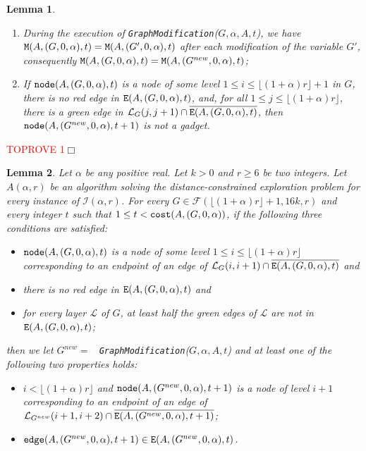 \documentclass[11pt]{article}
\newtheorem{lemma}{Lemma}[section]
\newcommand{\qed}{\hfill $\Box$ \bigbreak}
\newenvironment{proof}{\noindent {\bf Proof.}}{\qed}
\begin{document}
{\begin{lemma}
\begin{enumerate}
\item During the execution of {\tt GraphModification}($G,\alpha,A,t$), we have 
  ${\tt M}(A,(G,0,\alpha),t)={\tt M}(A,(G',0,\alpha),t)$ after each
  modification of the variable $G'$, consequently ${\tt M}(A,(G,0,\alpha),t)={\tt M}(A,(G^{new},0,\alpha),t)$;

\item If ${\tt node}(A,(G,0,\alpha),t)$ is a node of some level
  $1\leq i\leq\lfloor(1+\alpha)r\rfloor+1$ in $G$, there is no red edge in ${\tt E}(A,(G,0,\alpha),t)$, and, for all $1\leq j \leq
  \lfloor(1+\alpha)r\rfloor$, there is a green edge in
  $\mathcal{L}_{G}(j,j+1)\cap\overline{{\tt E}(A,(G,0,\alpha),t)}$,
  then ${\tt node}(A,(G^{new},0,\alpha),t+1)$ is not a gadget.
\end{enumerate}
\end{lemma}

\begin{proof}\textcolor{red}{TOPROVE 1}\end{proof}

\begin{lemma}
\label{lem:adv2}
Let $\alpha$ be any positive real. Let $k>0$ and $r\geq 6$ be two integers.
%
Let $A(\alpha,r)$ be an algorithm solving the distance-constrained exploration problem for every instance of $\mathcal{I}(\alpha,r)$.
%
For every $G\in\mathcal{F}(\lfloor(1+\alpha)r\rfloor+1,16k,r)$ and every integer $t$ such that $1\leq t < {\tt cost}(A,(G,0,\alpha))$, if the following three conditions are satisfied: 
\begin{itemize}
\item ${\tt node}(A,(G,0,\alpha),t)$ is a node of some level $1\leq i\leq\lfloor(1+\alpha)r\rfloor$ corresponding to an endpoint of an edge of $\mathcal{L}_{G}(i,i+1)\cap\overline{{\tt E}(A,(G,0,\alpha),t)}$ and
\item there is no red edge in ${\tt E}(A,(G,0,\alpha),t)$ and
\item for every layer $\mathcal{L}$ of $G$, at least half the green edges of $\mathcal{L}$ are not in ${\tt E}(A,(G,0,\alpha),t)$;
\end{itemize} 
then we let $G^{new}=$ {\tt
  GraphModification}($G,\alpha,A,t$) and at least one of the
following two properties holds:
\begin{itemize}
\item $i<\lfloor(1+\alpha)r\rfloor$ and ${\tt node}(A,(G^{new},0,\alpha),t+1)$ is a node of level $i+1$ corresponding to an endpoint of an edge of $\mathcal{L}_{G^{new}}(i+1,i+2)\cap\overline{{\tt E}(A,(G^{new},0,\alpha),t+1)}$;
\item ${\tt edge}(A,(G^{new},0,\alpha),t+1)\in{\tt E}(A,(G^{new},0,\alpha),t)$.
\end{itemize}
\end{lemma}

}
\end{document}
